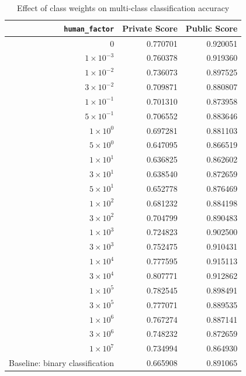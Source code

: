 \documentclass[conference]{IEEEtran}
\begin{document}
\begin{table}[htbp]
  \centering
  \caption{Effect of class weights on multi-class classification accuracy}
  \label{tab:multiclass}
  \begin{tabular}{rrr}
    \hline
    \textbf{\texttt{human\_factor}} & \textbf{Private Score} & \textbf{Public Score} \\
    \hline
    $0$ & 0.770701 & 0.920051 \\
    $1 \times 10^{-3}$ & 0.760378 & 0.919360 \\
    $1 \times 10^{-2}$ & 0.736073 & 0.897525 \\
    $3 \times 10^{-2}$ & 0.709871 & 0.880807 \\
    $1 \times 10^{-1}$ & 0.701310 & 0.873958 \\
    $5 \times 10^{-1}$ & 0.706552 & 0.883646 \\
    $1 \times 10^{0}$ & 0.697281 & 0.881103 \\
    $5 \times 10^{0}$ & 0.647095 & 0.866519 \\
    $1 \times 10^{1}$ & 0.636825 & 0.862602 \\
    $3 \times 10^{1}$ & 0.638540 & 0.872659 \\
    $5 \times 10^{1}$ & 0.652778 & 0.876469 \\
    $1 \times 10^{2}$ & 0.681232 & 0.884198 \\
    $3 \times 10^{2}$ & 0.704799 & 0.890483 \\
    $1 \times 10^{3}$ & 0.724823 & 0.902500 \\
    $3 \times 10^{3}$ & 0.752475 & 0.910431 \\
    $1 \times 10^{4}$ & 0.777595 & 0.915113 \\
    $3 \times 10^{4}$ & 0.807771 & 0.912862 \\
    $1 \times 10^{5}$ & 0.782545 & 0.898491 \\
    $3 \times 10^{5}$ & 0.777071 & 0.889535 \\
    $1 \times 10^{6}$ & 0.767274 & 0.887141 \\
    $3 \times 10^{6}$ & 0.748232 & 0.872659 \\
    $1 \times 10^{7}$ & 0.734994 & 0.864930 \\
    \hline
    Baseline: binary classification & 0.665908 & 0.891065 \\
    \hline
  \end{tabular}
\end{table}
\end{document}
